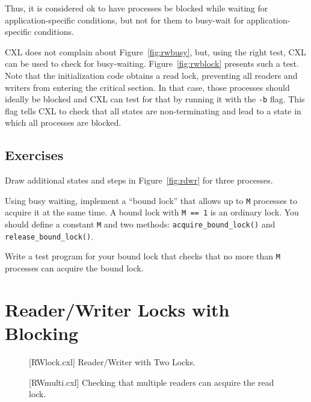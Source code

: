 \documentclass{report}
\newenvironment{code}{
\tcolorbox
}{
\endtcolorbox
}
\begin{document}
Thus, it is considered ok to have processes be blocked while waiting
for application-specific conditions, but not for them to
busy-wait for application-specific conditions.

CXL does not complain about Figure~\ref{fig:rwbusy}, but, using
the right test, CXL can be used to check for busy-waiting.
Figure~\ref{fig:rwblock} presents such a test.
Note that the initialization code obtains a read lock, preventing
all readers and writers from entering the critical section.
In that case, those processes should ideally be blocked and CXL
can test for that by running it with the \texttt{-b} flag.
This flag tells CXL to check
that all states are non-terminating and lead to a state in which
all processes are blocked.

\section*{Exercises}
\begin{problems}
\item Draw additional states and steps in Figure~\ref{fig:rdwr}
for three processes.
\item Using busy waiting, implement a ``bound lock'' that allows
up to \texttt{M} processes to acquire it at the same time.  A bound lock
with \texttt{M == 1} is an ordinary lock.
You should define a constant \texttt{M} and two methods:
\texttt{acquire\_bound\_lock()}
and \texttt{release\_bound\_lock()}.
\item Write a test program for your bound lock
that checks that no more than \texttt{M} processes can acquire the
bound lock.
\end{problems}

\chapter{Reader/Writer Locks with Blocking}
\label{ch:rdwr2}

\begin{figure}
\begin{code}
\end{code}
\caption{[RWlock.cxl] Reader/Writer with Two Locks.}
\label{fig:rw2lock}
\end{figure}

\begin{figure}
\begin{code}
\end{code}
\caption{[RWmulti.cxl] Checking that multiple readers can acquire the read lock.}
\label{fig:rwmulti}
\end{figure}
\end{document}
